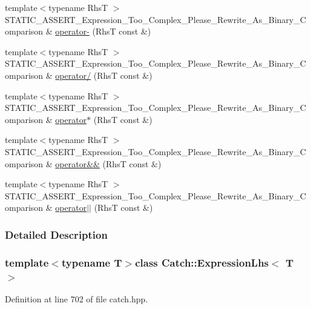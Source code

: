\begin{DoxyCompactItemize}
\item 
{\footnotesize template$<$typename Rhs\+T $>$ }\\S\+T\+A\+T\+I\+C\+\_\+\+A\+S\+S\+E\+R\+T\+\_\+\+Expression\+\_\+\+Too\+\_\+\+Complex\+\_\+\+Please\+\_\+\+Rewrite\+\_\+\+As\+\_\+\+Binary\+\_\+\+Comparison \& \hyperlink{a00028_a19ef0a33442bb18efef1ec65102151d1}{operator-\/} (Rhs\+T const \&)
\item 
{\footnotesize template$<$typename Rhs\+T $>$ }\\S\+T\+A\+T\+I\+C\+\_\+\+A\+S\+S\+E\+R\+T\+\_\+\+Expression\+\_\+\+Too\+\_\+\+Complex\+\_\+\+Please\+\_\+\+Rewrite\+\_\+\+As\+\_\+\+Binary\+\_\+\+Comparison \& \hyperlink{a00028_a37d50565046ac9b1c9159a7c0cf88a1e}{operator/} (Rhs\+T const \&)
\item 
{\footnotesize template$<$typename Rhs\+T $>$ }\\S\+T\+A\+T\+I\+C\+\_\+\+A\+S\+S\+E\+R\+T\+\_\+\+Expression\+\_\+\+Too\+\_\+\+Complex\+\_\+\+Please\+\_\+\+Rewrite\+\_\+\+As\+\_\+\+Binary\+\_\+\+Comparison \& \hyperlink{a00028_a9a94294c22449f62087862ef911e6291}{operator$\ast$} (Rhs\+T const \&)
\item 
{\footnotesize template$<$typename Rhs\+T $>$ }\\S\+T\+A\+T\+I\+C\+\_\+\+A\+S\+S\+E\+R\+T\+\_\+\+Expression\+\_\+\+Too\+\_\+\+Complex\+\_\+\+Please\+\_\+\+Rewrite\+\_\+\+As\+\_\+\+Binary\+\_\+\+Comparison \& \hyperlink{a00028_a7f022056ef4f25e716ab85846be6229f}{operator\&\&} (Rhs\+T const \&)
\item 
{\footnotesize template$<$typename Rhs\+T $>$ }\\S\+T\+A\+T\+I\+C\+\_\+\+A\+S\+S\+E\+R\+T\+\_\+\+Expression\+\_\+\+Too\+\_\+\+Complex\+\_\+\+Please\+\_\+\+Rewrite\+\_\+\+As\+\_\+\+Binary\+\_\+\+Comparison \& \hyperlink{a00028_a6932b72da79d6c6b03d867772ceac61b}{operator$\vert$$\vert$} (Rhs\+T const \&)
\end{DoxyCompactItemize}


\subsubsection{Detailed Description}
\subsubsection*{template$<$typename T$>$class Catch\+::\+Expression\+Lhs$<$ T $>$}



Definition at line 702 of file catch.\+hpp.



